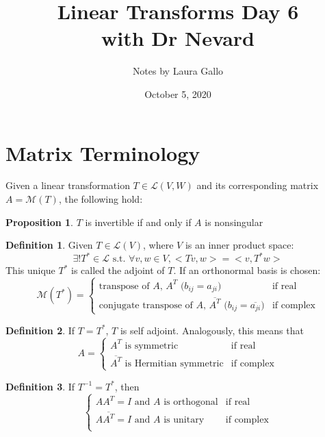 \documentclass{article}
\title{Linear Transforms Day 6 \\ with Dr Nevard}
\author{Notes by Laura Gallo}
\date{October 5, 2020}
\theoremstyle{definition}
\newtheorem{proposition}{Proposition}
\newtheorem{definition}{Definition}
\newcommand{\st}{\text{ s.t. }}
\begin{document}
\maketitle

\section{Matrix Terminology}
Given a linear transformation $T\in\mathcal{L}(V,W)$ and its corresponding matrix $A=\mathcal{M}(T)$, the following hold:

\begin{proposition}
	$T$ is invertible if and only if $A$ is nonsingular
\end{proposition}

\begin{definition}
	Given $T\in\mathcal{L}(V)$, where $V$ is an inner product space:
	$$\exists!T^\ast\in\mathcal{L}\st\forall v,w\in V,<Tv,w> = <v,T^\ast w>$$
	This unique $T^\ast$ is called the adjoint of $T$.
	If an orthonormal basis is chosen:
	\begin{equation*}
			\mathcal{M}(T^\ast)=\begin{cases}
				\text{transpose of $A$, $A^T$ ($b_{ij}=a_{ji}$)} & \text{if real} \\
				\text{conjugate transpose of $A$, $\overline{A^T}$ ($b_{ij}=\overline{a_{ji}}$)} & \text{if complex}
		\end{cases}
	\end{equation*}
\end{definition}

\begin{definition}
	If $T=T^\ast$, $T$ is self adjoint. Analogously, this means that
	\begin{equation*}
		A=\begin{cases}
			\text{$A^T$ is symmetric} & \text{if real} \\
			\text{$\overline{A^T}$ is Hermitian symmetric} & \text{if complex}
		\end{cases}
	\end{equation*}
\end{definition}
\begin{definition}
	If $T^{-1}=T^\ast$, then
	\begin{equation*}
		\begin{cases}
			AA^T=I \text{ and $A$ is orthogonal} & \text{if real} \\
			A\overline{A^T}=I \text{ and $A$ is unitary} & \text{if complex} \\
		\end{cases}
	\end{equation*}
\end{definition}
\end{document}
